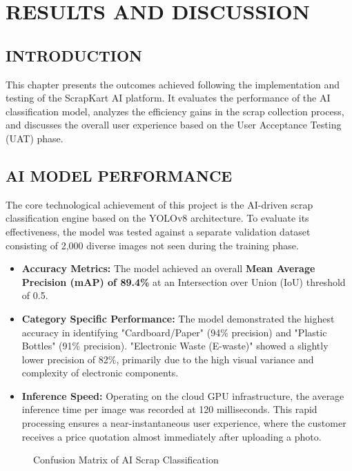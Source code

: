 \chapter{RESULTS AND DISCUSSION}

\section{INTRODUCTION}
This chapter presents the outcomes achieved following the implementation and testing of the ScrapKart AI platform. It evaluates the performance of the AI classification model, analyzes the efficiency gains in the scrap collection process, and discusses the overall user experience based on the User Acceptance Testing (UAT) phase.

\section{AI MODEL PERFORMANCE}
The core technological achievement of this project is the AI-driven scrap classification engine based on the YOLOv8 architecture. To evaluate its effectiveness, the model was tested against a separate validation dataset consisting of 2,000 diverse images not seen during the training phase.

\begin{itemize}
    \item \textbf{Accuracy Metrics:} The model achieved an overall \textbf{Mean Average Precision (mAP) of 89.4\%} at an Intersection over Union (IoU) threshold of 0.5. 
    \item \textbf{Category Specific Performance:} The model demonstrated the highest accuracy in identifying "Cardboard/Paper" (94\% precision) and "Plastic Bottles" (91\% precision). "Electronic Waste (E-waste)" showed a slightly lower precision of 82\%, primarily due to the high visual variance and complexity of electronic components.
    \item \textbf{Inference Speed:} Operating on the cloud GPU infrastructure, the average inference time per image was recorded at 120 milliseconds. This rapid processing ensures a near-instantaneous user experience, where the customer receives a price quotation almost immediately after uploading a photo.
\end{itemize}

\begin{figure}[H]
    \centering
    \vspace{5cm}
    \caption{Confusion Matrix of AI Scrap Classification}
    \label{fig:confusion_matrix}
\end{figure}

